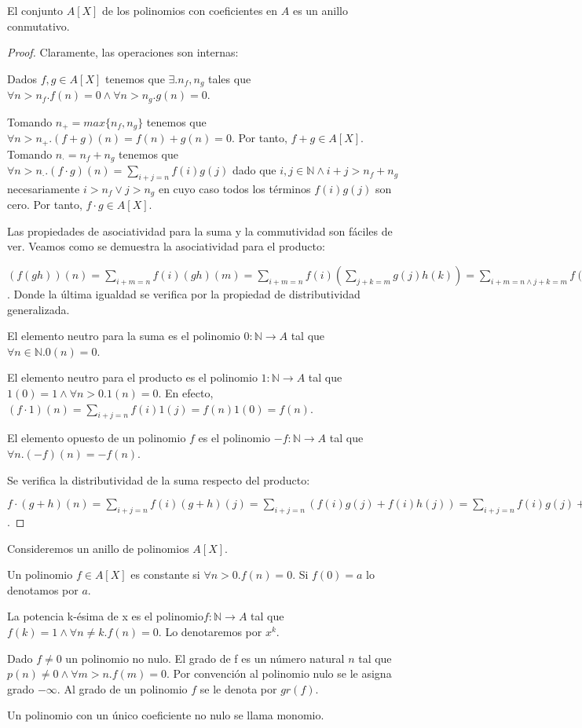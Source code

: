 \begin{proposition}
El conjunto $A[X]$ de los polinomios con coeficientes en $A$ es un anillo conmutativo. 
\end{proposition}
\begin{proof}
Claramente, las operaciones son internas:

Dados $f,g \in A[X]$ tenemos que $\exists. n_f,n_g$ tales que $\forall n > n_f. f(n) = 0 \land \forall n > n_g. g(n) = 0$. 

Tomando $n_+ = max\{n_f,n_g\}$ tenemos que $\forall n > n_+. (f+g)(n) = f(n)+g(n) = 0$. Por tanto, $f+g \in A[X]$. 
Tomando $n_\cdot = n_f + n_g$ tenemos que $\forall n > n_\cdot. (f \cdot g)(n) = \sum_{i+j = n} f(i)g(j)$ dado que $i,j \in \mathbb{N} \land i+j > n_f + n_g$ necesariamente $i > n_f \lor j > n_g$ en cuyo caso todos los términos $f(i)g(j)$ son cero. Por tanto, $f \cdot g \in A[X]$. 

Las propiedades de asociatividad para la suma y la commutividad son fáciles de ver. Veamos como se demuestra la asociatividad para el producto:

$(f(gh))(n) = \sum_{i+m = n} f(i)(gh)(m) = \sum_{i+m = n} f(i) (\sum_{j+k = m} g(j)h(k)) = \sum_{i+m = n \land j+k = m} f(i)g(j)h(k) = \sum_{i+j+k = m} f(i)g(j)h(k)$. Donde la última igualdad se verifica por la propiedad de distributividad generalizada. 

El elemento neutro para la suma es el polinomio $0: \mathbb{N} \to A$ tal que $\forall n \in \mathbb{N}. 0(n) = 0$. 

El elemento neutro para el producto es el polinomio $1:\mathbb{N} \to A$ tal que $1(0) = 1 \land \forall n > 0. 1(n) = 0$. En efecto, $(f\cdot 1)(n) = \sum_{i+j = n} f(i)1(j) = f(n)1(0) = f(n)$. 

El elemento opuesto de un polinomio $f$ es el polinomio $-f: \mathbb{N} \to A$ tal que $\forall n. (-f)(n) = -f(n)$. 

Se verifica la distributividad de la suma respecto del producto:

$f \cdot (g+h)(n) = \sum_{i+j = n} f(i) (g+h)(j) = \sum_{i+j = n} (f(i)g(j) + f(i)h(j)) = \sum_{i+j = n} f(i)g(j) + \sum_{i+j = n} f(i)h(j) = (f\cdot g + f \cdot h)(n)$.  
\end{proof}

\begin{definition}
Consideremos un anillo de polinomios $A[X]$. 

Un polinomio $f \in A[X]$ es constante si $\forall n > 0. f(n) = 0$. Si $f(0) = a$ lo denotamos por $a$. 

La potencia k-ésima de x es el polinomio$f: \mathbb{N} \to A$ tal que $f(k) = 1 \land \forall n \neq k. f(n) = 0$. Lo denotaremos por $x^k$. 

Dado $f \neq 0$ un polinomio no nulo. El grado de f es un número natural $n$ tal que $p(n) \neq 0 \land \forall m > n. f(m) = 0$. Por convención al polinomio nulo se le asigna grado $-\infty$.  Al grado de un polinomio $f$ se le denota por $gr(f)$. 

Un polinomio con un único coeficiente no nulo se llama monomio. 
\end{definition}


